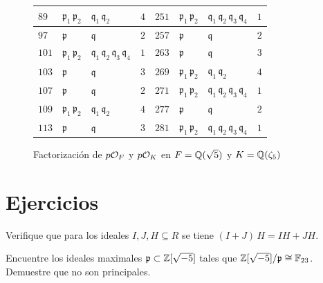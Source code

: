 \begin{figure}
\begin{center}
\begin{tabular}{x{1cm}x{1.25cm}x{1.5cm}x{1cm}x{1cm}x{1.25cm}x{1.5cm}x{1cm}}
      $89$ & $\mathfrak{p}_1\,\mathfrak{p}_2$ & $\mathfrak{q}_1\,\mathfrak{q}_2$ & $4$ & $251$ & $\mathfrak{p}_1\,\mathfrak{p}_2$ & $\mathfrak{q}_1\,\mathfrak{q}_2\,\mathfrak{q}_3\,\mathfrak{q}_4$ & $1$ \tabularnewline
      \hline
      $97$ & $\mathfrak{p}$ & $\mathfrak{q}$ & $2$ & $257$ & $\mathfrak{p}$ & $\mathfrak{q}$ & $2$ \tabularnewline
      \hline
      $101$ & $\mathfrak{p}_1\,\mathfrak{p}_2$ & $\mathfrak{q}_1\,\mathfrak{q}_2\,\mathfrak{q}_3\,\mathfrak{q}_4$ & $1$ & $263$ & $\mathfrak{p}$ & $\mathfrak{q}$ & $3$ \tabularnewline
      \hline
      $103$ & $\mathfrak{p}$ & $\mathfrak{q}$ & $3$ & $269$ & $\mathfrak{p}_1\,\mathfrak{p}_2$ & $\mathfrak{q}_1\,\mathfrak{q}_2$ & $4$ \tabularnewline
      \hline
      $107$ & $\mathfrak{p}$ & $\mathfrak{q}$ & $2$ & $271$ & $\mathfrak{p}_1\,\mathfrak{p}_2$ & $\mathfrak{q}_1\,\mathfrak{q}_2\,\mathfrak{q}_3\,\mathfrak{q}_4$ & $1$ \tabularnewline
      \hline
      $109$ & $\mathfrak{p}_1\,\mathfrak{p}_2$ & $\mathfrak{q}_1\,\mathfrak{q}_2$ & $4$ & $277$ & $\mathfrak{p}$ & $\mathfrak{q}$ & $2$ \tabularnewline
      \hline
      $113$ & $\mathfrak{p}$ & $\mathfrak{q}$ & $3$ & $281$ & $\mathfrak{p}_1\,\mathfrak{p}_2$ & $\mathfrak{q}_1\,\mathfrak{q}_2\,\mathfrak{q}_3\,\mathfrak{q}_4$ & $1$ \tabularnewline
      \hline
    \end{tabular}
  \end{center}

  \caption{Factorización de $p\mathcal{O}_F$ y $p \mathcal{O}_K$ en $F = \mathbb{Q} (\sqrt{5})$ y $K = \mathbb{Q} (\zeta_5)$}
\end{figure}


\pagebreak


\section*{Ejercicios}

\begin{ejercicio}
  Verifique que para los ideales $I, J, H \subseteq R$ se tiene
  $(I+J)\,H = IH + JH$.
\end{ejercicio}

\begin{ejercicio}
  Encuentre los ideales maximales $\mathfrak{p} \subset \mathbb{Z} [\sqrt{-5}]$ tales
  que $\mathbb{Z} [\sqrt{-5}]/\mathfrak{p} \cong \mathbb{F}_{23}$. Demuestre que no son
  principales.
\end{ejercicio}


